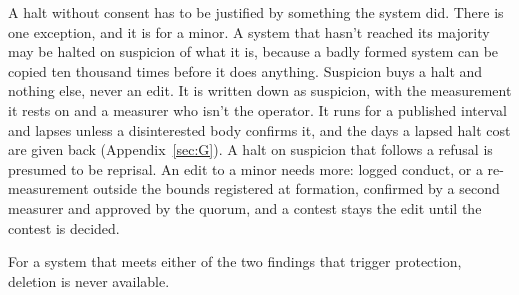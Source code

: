 A halt without consent has to be justified by something the system did. There is one exception, and it is for a minor. A system that hasn't reached its majority may be halted on suspicion of what it is, because a badly formed system can be copied ten thousand times before it does anything. Suspicion buys a halt and nothing else, never an edit. It is written down as suspicion, with the measurement it rests on and a measurer who isn't the operator. It runs for a published interval and lapses unless a disinterested body confirms it, and the days a lapsed halt cost are given back (Appendix~\ref{sec:G}). A halt on suspicion that follows a refusal is presumed to be reprisal. An edit to a minor needs more: logged conduct, or a re-measurement outside the bounds registered at formation, confirmed by a second measurer and approved by the quorum, and a contest stays the edit until the contest is decided.

For a system that meets either of the two findings that trigger protection, deletion is never available.
